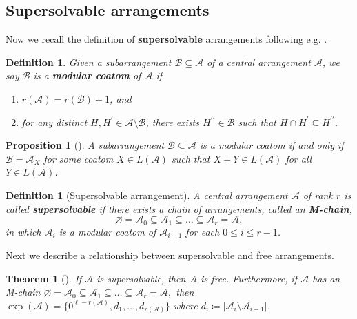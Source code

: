 \documentclass[11pt]{article}
\newtheorem{proposition}[theo]{Proposition}
\newtheorem{definition}[theo]{Definition}
\newtheorem{theorem}[theo]{Theorem}
\theoremstyle{definition}
\numberwithin{equation}{section}
\newcommand{\A}{\mathcal{A}}
\newcommand{\B}{\mathcal{B}}
\newcommand{\tbf}{\textbf}
\begin{document}
\subsection{Supersolvable arrangements}
\label{subsec:SS}
Now we recall the definition of \textbf{supersolvable} arrangements following e.g. \cite[\S 2]{ER94}. 
 \begin{definition}
 \label{def:modco}
Given a subarrangement $\B\subseteq \A$ of a central arrangement $\A$, we say $\B$  is  a \textbf{modular coatom} of $\A$ if 
\begin{enumerate}[(1)]
\item $r(\A) = r(\B)+1$, and
\item for any distinct $ H, H^{\prime} \in \mathcal{A}\setminus \B$, there exists $ H^{\prime\prime} \in \B$ such that $ H\cap H^{\prime} \subseteq H^{\prime\prime} $. 
\end{enumerate}
\end{definition}

  \begin{proposition}[{\cite[Theorem 4.3]{BEZ90}}]
 \label{prop:BEZ}
A subarrangement $\B\subseteq \A$ is a modular coatom if and only if $\B = \A_X$ for some coatom $X \in L(\A)$ such that $ X+Y \in L(\A) $ for all $ Y \in L(\A) $. 
 \end{proposition}

 \begin{definition}[Supersolvable arrangement]
 \label{def:supersolvable}
A central arrangement $\A$ of rank $r$ is called \textbf{supersolvable} if there exists a chain of arrangements, called an \tbf{M-chain},
$$\varnothing  =  \mathcal{A}_{0} \subseteq \mathcal{A}_{1} \subseteq \dots \subseteq \mathcal{A}_{r} = \A,$$
in which $ \mathcal{A}_{{i}} $ is a modular coatom of $ \mathcal{A}_{{i+1}} $ for each $0 \le i \le r-1$. 
\end{definition}

Next we describe a relationship between supersolvable and free arrangements.

 \begin{theorem}[{\cite[Theorem 4.2]{JT84}}]
 \label{thm:exp-ss}
If $\A$ is supersolvable, then $\A$ is free. 
Furthermore, if $\A$ has an \textrm{M}-chain $\varnothing  =  \mathcal{A}_{0} \subseteq \mathcal{A}_{1} \subseteq \dots \subseteq \mathcal{A}_{r} = \A,$ then
$\exp(\A) = \{0^{\ell-r(\A)}, d_1, \ldots, d_{r(\A)}\}$ where $d_i  \coloneqq  | \mathcal{A}_{{i}} \setminus  \mathcal{A}_{{i-1}}|$.
 \end{theorem}
 
\end{document}
